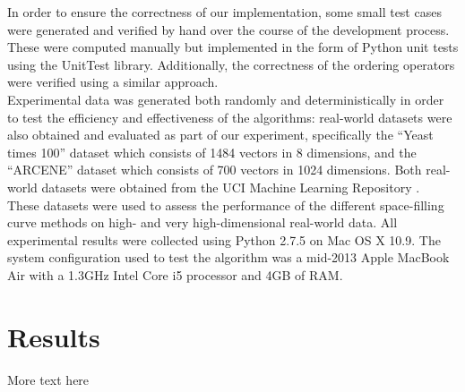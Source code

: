 \documentclass[10pt]{article}
\begin{document}
In order to ensure the correctness of our implementation, some small test cases were generated and verified by hand over the course of the development process. These were computed manually but implemented in the form of Python unit tests using the UnitTest library. Additionally, the correctness of the ordering operators were verified using a similar approach. \\

Experimental data was generated both randomly and deterministically in order to test the efficiency and effectiveness of the algorithms: real-world datasets were also obtained and evaluated as part of our experiment, specifically the ``Yeast times 100'' dataset which consists of 1484 vectors in 8 dimensions, and the ``ARCENE'' dataset \cite{ARCENE:2004} which consists of 700 vectors in 1024 dimensions. Both real-world datasets were obtained from the UCI Machine Learning Repository \cite{UCI:2013}. \\

These datasets were used to assess the performance of the different space-filling curve methods on high- and very high-dimensional real-world data. All experimental results were collected using Python 2.7.5 on Mac OS X 10.9. The system configuration used to test the algorithm was a mid-2013 Apple MacBook Air with a 1.3GHz Intel Core i5 processor and 4GB of RAM.

\section{Results}

More text here
\end{document}
